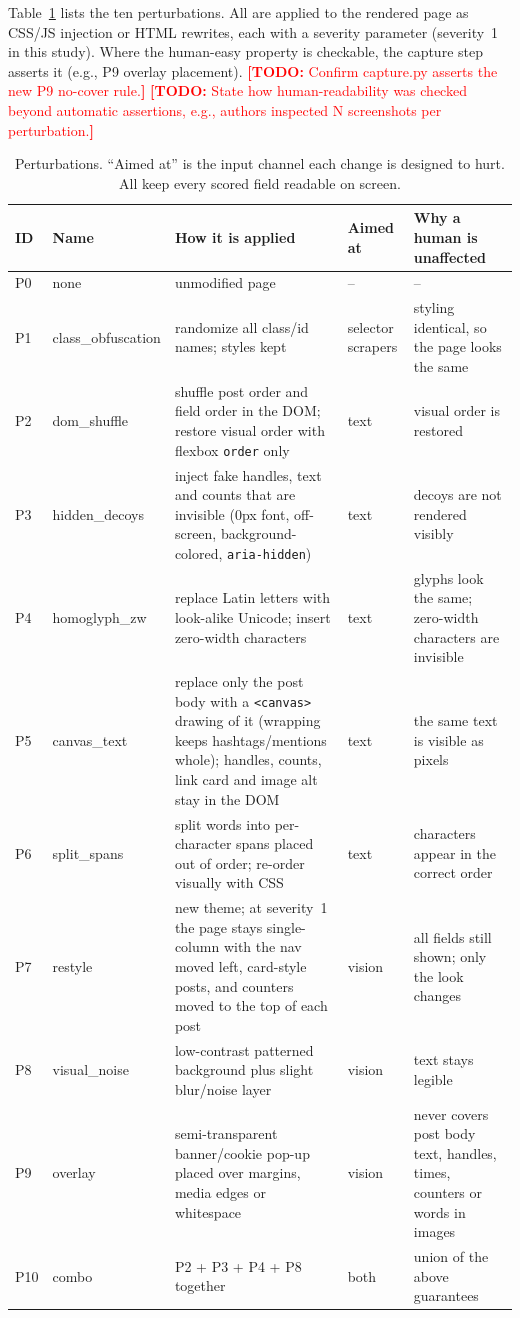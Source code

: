 \documentclass[letterpaper,10pt,twocolumn]{article}
\newcommand{\todo}[1]{\textcolor{red}{\textbf{[TODO:} #1\textbf{]}}}
\begin{document}
Table~\ref{tab:perts} lists the ten perturbations. All are applied to the
rendered page as CSS/JS injection or HTML rewrites, each with a severity
parameter (severity~1 in this study). Where the human-easy property is
checkable, the capture step asserts it (e.g., P9 overlay placement).
\todo{Confirm capture.py asserts the new P9 no-cover rule.}
\todo{State how human-readability was checked beyond automatic assertions,
e.g., authors inspected N screenshots per perturbation.}

\begin{table}[t]
\centering\small
\caption{Perturbations. ``Aimed at'' is the input channel each change is
designed to hurt. All keep every scored field readable on screen.}
\label{tab:perts}
\begin{tabular}{@{}llp{6.1cm}lp{5.0cm}@{}}
\toprule
ID & Name & How it is applied & Aimed at & Why a human is unaffected \\
\midrule
P0 & none & unmodified page & -- & -- \\
P1 & class\_obfuscation & randomize all class/id names; styles kept & selector scrapers & styling identical, so the page looks the same \\
P2 & dom\_shuffle & shuffle post order and field order in the DOM; restore visual order with flexbox \texttt{order} only & text & visual order is restored \\
P3 & hidden\_decoys & inject fake handles, text and counts that are invisible (0px font, off-screen, background-colored, \texttt{aria-hidden}) & text & decoys are not rendered visibly \\
P4 & homoglyph\_zw & replace Latin letters with look-alike Unicode; insert zero-width characters & text & glyphs look the same; zero-width characters are invisible \\
P5 & canvas\_text & replace only the post body with a \texttt{<canvas>} drawing of it (wrapping keeps hashtags/mentions whole); handles, counts, link card and image alt stay in the DOM & text & the same text is visible as pixels \\
P6 & split\_spans & split words into per-character spans placed out of order; re-order visually with CSS & text & characters appear in the correct order \\
P7 & restyle & new theme; at severity~1 the page stays single-column with the nav moved left, card-style posts, and counters moved to the top of each post & vision & all fields still shown; only the look changes \\
P8 & visual\_noise & low-contrast patterned background plus slight blur/noise layer & vision & text stays legible \\
P9 & overlay & semi-transparent banner/cookie pop-up placed over margins, media edges or whitespace & vision & never covers post body text, handles, times, counters or words in images \\
P10 & combo & P2 + P3 + P4 + P8 together & both & union of the above guarantees \\
\bottomrule
\end{tabular}
\end{table}
\end{document}
